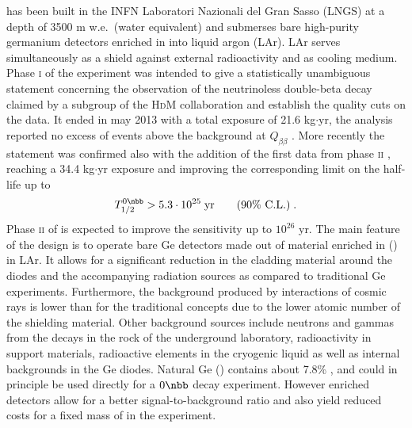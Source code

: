 {\gerda} has been built in the INFN Laboratori Nazionali del Gran Sasso (LNGS) at a depth of 3500 m w.e.~(water equivalent) and submerses bare high-purity germanium detectors enriched in  into liquid argon (LAr). LAr serves simultaneously as a shield against external radioactivity and as cooling medium. Phase \textsc{i} of the experiment was intended to give a statistically unambiguous statement concerning the observation of the neutrinoless double-beta decay claimed by a subgroup of the \textsc{HdM} collaboration \cite{hdmclaim} and establish the quality cuts on the data. It ended in may 2013 with a total exposure of 21.6 kg$\cdot$yr, the analysis reported no excess of events above the background at $Q_{\beta\beta}$ \cite{resultsphase1}. More recently the statement was confirmed also with the addition of the first data from phase \textsc{ii} \cite{nature}, reaching a 34.4 kg$\cdot$yr exposure and improving the corresponding limit on the half-life up to
\[T_{1/2}^{0\nbb}>5.3\cdot10^{25}\;\text{yr}\qquad\text{(90\% C.L.)}\;.\]
Phase \textsc{ii} of {\gerda} is expected to improve the sensitivity up to $10^{26}$ yr.
\newpage
{} The main feature of the {\gerda} design is to operate bare Ge detectors made out of material enriched in  () in LAr. It allows for a significant reduction in the cladding material around the diodes and the accompanying radiation sources as compared to traditional Ge experiments. Furthermore, the background produced by interactions of cosmic rays is lower than for the traditional concepts due to the lower atomic number of the shielding material. Other background sources include neutrons and gammas from the decays in the rock of the underground laboratory, radioactivity in support materials, radioactive elements in the cryogenic liquid as well as internal backgrounds in the Ge diodes. Natural Ge () contains about 7.8\% , and could in principle be used directly for a $0\nbb$ decay experiment. However enriched detectors allow for a better signal-to-background ratio and also yield reduced costs for a fixed mass of  in the experiment.
